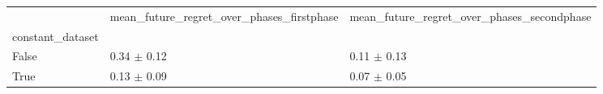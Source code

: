 \begin{tabular}{lll}
\toprule
 & mean_future_regret_over_phases_firstphase & mean_future_regret_over_phases_secondphase \\
constant_dataset &  &  \\
\midrule
False & 0.34 $\pm$ 0.12 & 0.11 $\pm$ 0.13 \\
True & 0.13 $\pm$ 0.09 & 0.07 $\pm$ 0.05 \\
\bottomrule
\end{tabular}
